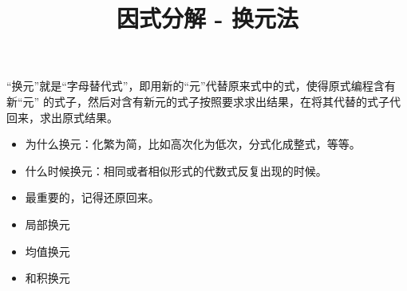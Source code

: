 \documentclass[windows,csize4,answers]{BHCexam}
\title{因式分解 - 换元法}
\begin{document}
\maketitle

\begin{groups}
    “换元”就是“字母替代式”，即用新的“元”代替原来式中的式，使得原式编程含有新“元”
    的式子，然后对含有新元的式子按照要求求出结果，在将其代替的式子代回来，求出原式结果。
    \begin{itemize}
        \item 为什么换元：化繁为简，比如高次化为低次，分式化成整式，等等。
        \item 什么时候换元：相同或者相似形式的代数式反复出现的时候。
        \item 最重要的，记得还原回来。
    \end{itemize}

    \begin{itemize}
        \item 局部换元
        \item 均值换元
        \item 和积换元
    \end{itemize}


\end{groups}
\end{document}
